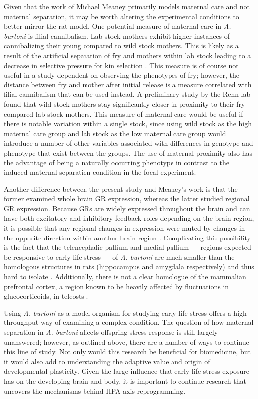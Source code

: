 \documentclass[12pt,twoside]{reedthesis}
\begin{document}
Given that the work of Michael Meaney primarily models maternal care and not
maternal separation, it may be worth altering the experimental conditions to
better mirror the rat model. One potential measure of maternal care in
\textit{A. burtoni} is filial cannibalism. Lab stock mothers exhibit higher
instances of cannibalizing their young compared to wild stock mothers. This is likely as
a result of the artificial separation of fry and mothers within lab stock
leading to a
decrease in selective pressure for kin selection \citep{renn_maternal_2009, lonstein_sensory_2002}. This measure is of course not useful
in a study dependent on observing the phenotypes of fry; however, the distance between fry and mother after initial
release is a measure correlated with filial cannibalism that can be used instead. A preliminary study by the
Renn lab found that wild stock mothers stay significantly closer in proximity to their
fry compared lab stock mothers. This measure of maternal care would be useful if
there is notable variation within a single stock, since using wild stock
as the high maternal care group and lab stock as the low maternal care group
would introduce a number of other variables associated with differences in genotype and phenotype that
exist between the groups. The use of maternal proximity also has the advantage of being a naturally
occurring phenotype in contrast to the induced maternal
separation condition in the focal experiment. 

Another difference between the present study and Meaney's work is that the
former examined whole brain GR expression, whereas the latter studied regional
GR expression. Because GRs are widely expressed throughout the brain and can
have both excitatory and inhibitory feedback roles depending on the brain
region, it is possible that any regional changes in expression were muted by
changes in the opposite direction within another brain region \citep{2017Nrid,
  herman_limbic_2005}. Complicating this possibility is the fact that the telencephalic pallium and medial
pallium --- regions expected be responsive to early life stress --- of
\textit{A. burtoni} are much smaller than the homologous structures in rats
(hippocampus and amygdala respectively) and thus hard to isolate \citep{salas_neuropsychology_2006}. Additionally,
there is not a clear homologue of the mammalian prefrontal cortex, a region
known to be heavily affected by fluctuations in glucocorticoids, in teleosts
\citep{lupien_effects_2009, yamamoto_studies_2009}. 

Using \textit{A. burtoni} as a model organism for studying early life
stress offers a high throughput way of examining a complex condition. The question of how maternal separation in \textit{A.
  burtoni} affects offspring stress response is still largely unanswered;
however, as outlined above, there are a number of ways to continue this line of
study. Not
only would this research be beneficial for biomedicine, but it would also add to
understanding the adaptive value and origin of developmental plasticity. Given the large influence that early life stress exposure has on the developing
brain and body, it is important to continue research that uncovers the
mechanisms behind HPA axis reprogramming.
\end{document}
